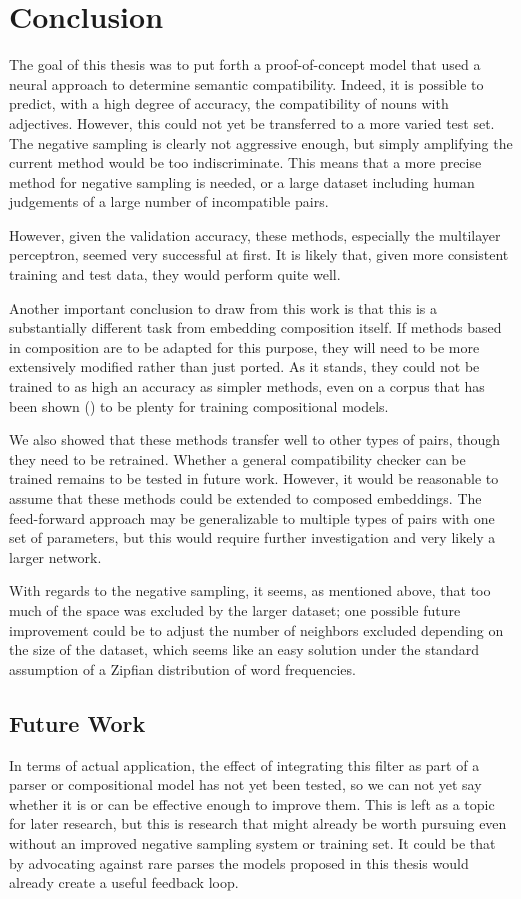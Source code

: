 \documentclass[a4paper, 12pt]{article}
\begin{document}
\section{Conclusion}

The goal of this thesis was to put forth a proof-of-concept model that used a neural approach to determine semantic compatibility. Indeed, it is possible to predict, with a high degree of accuracy, the compatibility of nouns with adjectives. However, this could not yet be transferred to a more varied test set. The negative sampling is clearly not aggressive enough, but simply amplifying the current method would be too indiscriminate. This means that a more precise method for negative sampling is needed, or a large dataset including human judgements of a large number of incompatible pairs.

However, given the validation accuracy, these methods, especially the multilayer perceptron, seemed very successful at first. It is likely that, given more consistent training and test data, they would perform quite well.

Another important conclusion to draw from this work is that this is a substantially different task from embedding composition itself. If methods based in composition are to be adapted for this purpose, they will need to be more extensively modified rather than just ported. As it stands, they could not be trained to as high an accuracy as simpler methods, even on a corpus that has been shown (\cite{TSelect}) to be plenty for training compositional models.

We also showed that these methods transfer well to other types of pairs, though they need to be retrained. Whether a general compatibility checker can be trained remains to be tested in future work. However, it would be reasonable to assume that these methods could be extended to composed embeddings. The feed-forward approach may be generalizable to multiple types of pairs with one set of parameters, but this would require further investigation and very likely a larger network.

With regards to the negative sampling, it seems, as mentioned above, that too much of the space was excluded by the larger dataset; one possible future improvement could be to adjust the number of neighbors excluded depending on the size of the dataset, which seems like an easy solution under the standard assumption of a Zipfian distribution of word frequencies.

\subsection{Future Work}
In terms of actual application, the effect of integrating this filter as part of a parser or compositional model has not yet been tested, so we can not yet say whether it is or can be effective enough to improve them. This is left as a topic for later research, but this is research that might already be worth pursuing even without an improved negative sampling system or training set. It could be that by advocating against rare parses the models proposed in this thesis would already create a useful feedback loop.
\end{document}
